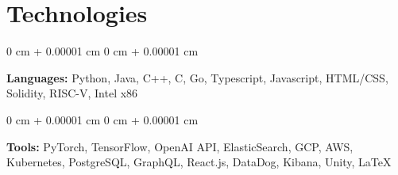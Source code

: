\documentclass[10pt, letterpaper]{article}
\newenvironment{onecolentry}{
    \begin{adjustwidth}{
        0 cm + 0.00001 cm
    }{
        0 cm + 0.00001 cm
    }
}{
    \end{adjustwidth}
} %
\begin{document}
    
    \section{Technologies}



        
        \begin{onecolentry}
            \textbf{Languages:} Python, Java, C++, C, Go, Typescript, Javascript, HTML/CSS, Solidity, RISC-V, Intel x86
        \end{onecolentry}

        \vspace{0.2 cm}

        \begin{onecolentry}
            \textbf{Tools:} PyTorch, TensorFlow, OpenAI API, ElasticSearch, GCP, AWS, Kubernetes, PostgreSQL, GraphQL, React.js, DataDog, Kibana, Unity, LaTeX
        \end{onecolentry}


    
\end{document}
